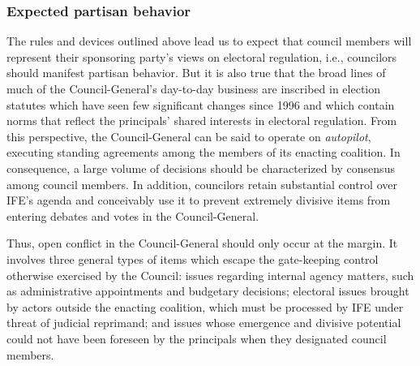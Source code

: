 \documentclass[12 pt, letter]{article}
\begin{document}
\subsubsection{Expected partisan behavior}
The rules and devices outlined above lead us to expect that council
members will represent their sponsoring party's views on electoral
regulation, i.e., councilors should manifest partisan behavior.  But
it is also true that the broad lines of much of the
Council-General's day-to-day business are inscribed in election
statutes which have seen few significant changes since 1996 and
which contain norms that reflect the principals' shared interests in
electoral regulation.  From this perspective, the Council-General
can be said to operate on \emph{autopilot}, executing standing
agreements among the members of its enacting coalition.  In
consequence, a large volume of decisions should be characterized by
consensus among council members.  In addition, councilors retain
substantial control over IFE's agenda and conceivably use it to
prevent extremely divisive items from entering debates and votes in
the Council-General.

Thus, open conflict in the Council-General should only occur at the
margin.  It involves three general types of items which escape the
gate-keeping control otherwise exercised by the Council: issues
regarding internal agency matters, such as administrative
appointments and budgetary decisions; electoral issues brought by
actors outside the enacting coalition, which must be processed by
IFE under threat of judicial reprimand; and issues whose emergence
and divisive potential could not have been foreseen by the
principals when they designated council members.
\end{document}
